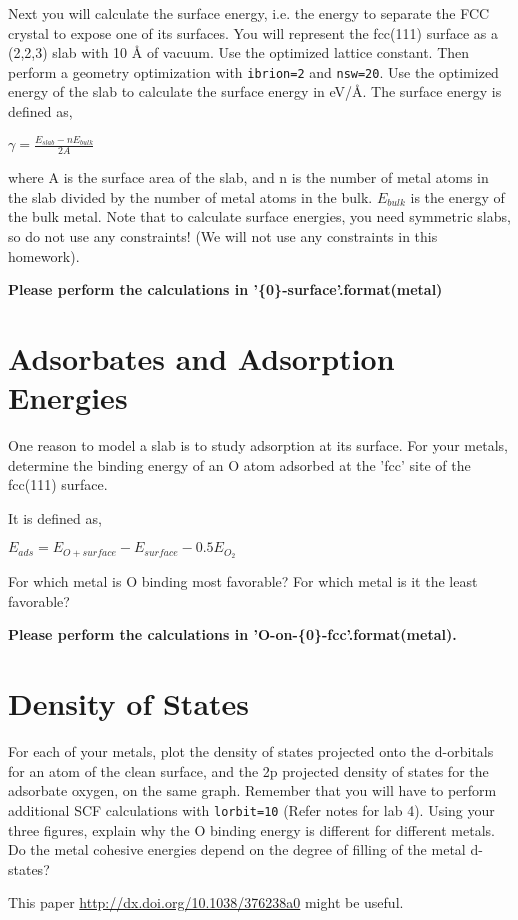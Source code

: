 \documentclass[11pt]{article}
\begin{document}
Next you will calculate the surface energy, i.e. the energy to separate the FCC crystal to expose one of its surfaces. You will represent the fcc(111) surface as a (2,2,3) slab with 10 \AA{} of vacuum. Use the optimized lattice constant. Then perform a geometry optimization with \verb~ibrion=2~ and \verb~nsw=20~. 
Use the optimized energy of the slab to calculate the surface energy in eV/\AA{}. The surface energy is defined as,

$\gamma = \frac{E_{slab} - nE_{bulk}}{2A}$

where A is the surface area of the slab, and n is the number of metal atoms in the slab divided by the number of metal atoms in the bulk. $E_{bulk}$ is the energy of the bulk metal. Note that to calculate surface energies, you need symmetric slabs, so do not use any constraints! (We will not use any constraints in this homework).

\textbf{Please perform the calculations in '\{0\}-surface'.format(metal)}

\section{Adsorbates and Adsorption Energies}
\label{sec-6}

One reason to model a slab is to study adsorption at its surface.  For your metals, determine the binding energy of an O atom adsorbed at the 'fcc' site of the fcc(111) surface. 

It is defined as,

$E_{ads} = E_{O+surface} - E_{surface} - 0.5 E_{O_{2}}$

For which metal is O binding most favorable? For which metal is it the least favorable?

\textbf{Please perform the calculations in 'O-on-\{0\}-fcc'.format(metal).}

\section{Density of States}
\label{sec-7}
For each of your metals, plot the density of states projected onto the d-orbitals for an atom of the clean surface, and the 2p projected density of states for the adsorbate oxygen, on the same graph. Remember that you will have to perform additional SCF calculations with \verb~lorbit=10~ (Refer notes for lab 4). Using your three figures, explain why the O binding energy is different for different metals. Do the metal cohesive energies depend on the degree of filling of the metal d-states?

This paper \url{http://dx.doi.org/10.1038/376238a0} might be useful.
\end{document}
